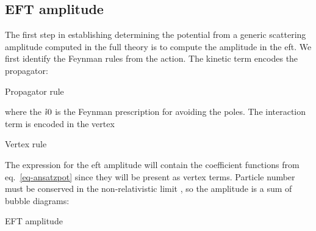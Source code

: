 \documentclass[
  11pt,
  a4paper,
  DIV=11,
  numbers=noendperiod,
  oneside]{scrreprt}
\DeclareRobustCommand{\[}{\begin{equation}}
\DeclareRobustCommand{\]}{\end{equation}}
\begin{document}
\hypertarget{eft-amplitude}{%
\subsection{EFT amplitude}\label{eft-amplitude}}

The first step in establishing determining the potential from a generic
scattering amplitude computed in the full theory is to compute the
amplitude in the \gls{eft}. We first identify the Feynman rules from the
action. The kinetic term encodes the propagator:

\hypertarget{fig-propagator}{}
{
\makeatletter
\def\LT@makecaption#1#2#3{%
  \noalign{\smash{\hbox{\kern\textwidth\rlap{\kern\marginparsep
  \parbox[t]{\marginparwidth}{%
    \footnotesize{%
      \vspace{(1.1\baselineskip)}
    #1{#2: }\ignorespaces #3}}}}}}%
    }
\makeatother



\label{fig-propagator}Propagator rule

}

where the \(\mathring{\imath} 0\) is the Feynman prescription for avoiding the poles.
The interaction term is encoded in the vertex

\hypertarget{fig-vertex}{}
{
\makeatletter
\def\LT@makecaption#1#2#3{%
  \noalign{\smash{\hbox{\kern\textwidth\rlap{\kern\marginparsep
  \parbox[t]{\marginparwidth}{%
    \footnotesize{%
      \vspace{(1.1\baselineskip)}
    #1{#2: }\ignorespaces #3}}}}}}%
    }
\makeatother



\label{fig-vertex}Vertex rule

}

The expression for the \gls{eft} amplitude will contain the coefficient
functions from eq.~\ref{eq-ansatzpot} since they will be present as
vertex terms. Particle number must be conserved in the non-relativistic
limit , so the
amplitude is a sum of bubble diagrams:

\hypertarget{fig-eftampl}{}
{
\makeatletter
\def\LT@makecaption#1#2#3{%
  \noalign{\smash{\hbox{\kern\textwidth\rlap{\kern\marginparsep
  \parbox[t]{\marginparwidth}{%
    \footnotesize{%
      \vspace{(1.1\baselineskip)}
    #1{#2: }\ignorespaces #3}}}}}}%
    }
\makeatother



\label{fig-eftampl}EFT amplitude

}
\end{document}
